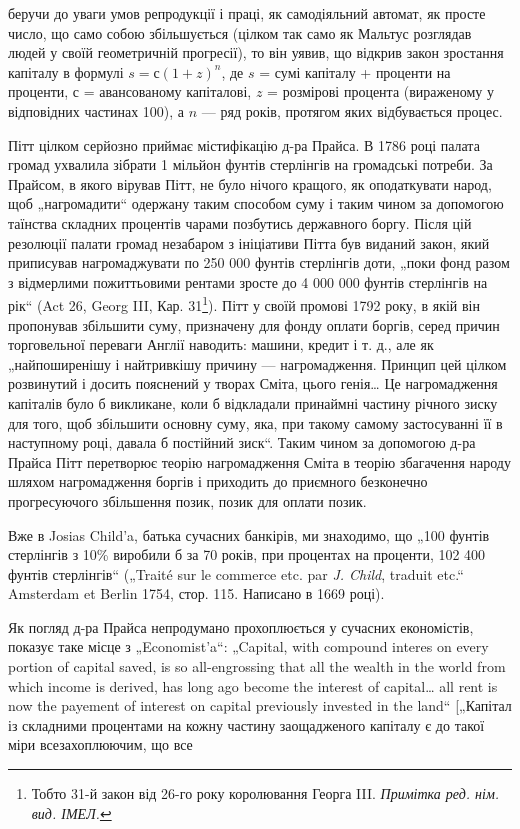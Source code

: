\parcont{}  %
беручи до уваги умов репродукції і праці, як самодіяльний
автомат, як просте число, що само собою збільшується (цілком
так само як Мальтус розглядав людей у своїй геометричній
прогресії), то він уявив, що відкрив закон зростання капіталу
в формулі $s = с (1 + z)^n$, де $s$ = сумі капіталу + проценти на
проценти, $с$ = авансованому капіталові, $z$ = розмірові процента
(вираженому у відповідних частинах 100), а $n$ — ряд років, протягом
яких відбувається процес.

Пітт цілком серйозно приймає містифікацію д-ра Прайса.
В 1786 році палата громад ухвалила зібрати 1 мільйон фунтів стерлінгів
на громадські потреби. За Прайсом, в якого вірував Пітт,
не було нічого кращого, як оподаткувати народ, щоб „нагромадити“
одержану таким способом суму і таким чином за допомогою
таїнства складних процентів чарами позбутись державного
боргу. Після цій резолюції палати громад незабаром з ініціативи
Пітта був виданий закон, який приписував нагромаджувати по
250 000 фунтів стерлінгів доти, „поки фонд разом з відмерлими
пожиттьовими рентами зросте до 4 000 000 фунтів стерлінгів
на рік“ (Act 26, Georg III, Кар. 31\footnote*{
Тобто 31-й закон від 26-го року королювання Георга III.
\emph{Примітка ред. нім. вид. ІМЕЛ.}
}). Пітт у своїй промові 1792 року,
в якій він пропонував збільшити суму, призначену для фонду
оплати боргів, серед причин торговельної переваги Англії наводить:
машини, кредит і т. д., але як „найпоширенішу і найтривкішу
причину — нагромадження. Принцип цей цілком розвинутий
і досить пояснений у творах Сміта, цього генія\dots{} Це нагромадження
капіталів було б викликане, коли б відкладали принаймні
частину річного зиску для того, щоб збільшити основну
суму, яка, при такому самому застосуванні її в наступному році,
давала б постійний зиск“. Таким чином за допомогою д-ра Прайса
Пітт перетворює теорію нагромадження Сміта в теорію збагачення
народу шляхом нагромадження боргів і приходить до
приємного безконечно прогресуючого збільшення позик, позик
для оплати позик.

Вже в Josias Child’a, батька сучасних банкірів, ми знаходимо,
що „100 фунтів стерлінгів з 10\% виробили б за 70 років, при
процентах на проценти, 102 400 фунтів стерлінгів“ („Traité sur le
commerce etc. par \emph{J. Child}, traduit etc.“ Amsterdam et Berlin
1754, стор. 115. Написано в 1669 році).

Як погляд д-ра Прайса непродумано прохоплюється у сучасних
економістів, показує таке місце з „Economist’a“: „Capital,
with compound interes on every portion of capital saved, is so
all-engrossing that all the wealth in the world from which income
is derived, has long ago become the interest of capital\dots{} all rent is
now the payement of interest on capital previously invested in the
land“ [„Капітал із складними процентами на кожну частину заощадженого
капіталу є до такої міри всезахоплюючим, що все
\parbreak{}  %
